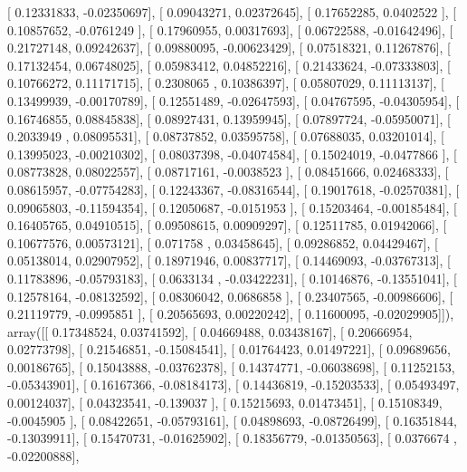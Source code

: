 \documentclass{article}
\begin{document}
       [ 0.12331833, -0.02350697],
       [ 0.09043271,  0.02372645],
       [ 0.17652285,  0.0402522 ],
       [ 0.10857652, -0.0761249 ],
       [ 0.17960955,  0.00317693],
       [ 0.06722588, -0.01642496],
       [ 0.21727148,  0.09242637],
       [ 0.09880095, -0.00623429],
       [ 0.07518321,  0.11267876],
       [ 0.17132454,  0.06748025],
       [ 0.05983412,  0.04852216],
       [ 0.21433624, -0.07333803],
       [ 0.10766272,  0.11171715],
       [ 0.2308065 ,  0.10386397],
       [ 0.05807029,  0.11113137],
       [ 0.13499939, -0.00170789],
       [ 0.12551489, -0.02647593],
       [ 0.04767595, -0.04305954],
       [ 0.16746855,  0.08845838],
       [ 0.08927431,  0.13959945],
       [ 0.07897724, -0.05950071],
       [ 0.2033949 ,  0.08095531],
       [ 0.08737852,  0.03595758],
       [ 0.07688035,  0.03201014],
       [ 0.13995023, -0.00210302],
       [ 0.08037398, -0.04074584],
       [ 0.15024019, -0.0477866 ],
       [ 0.08773828,  0.08022557],
       [ 0.08717161, -0.0038523 ],
       [ 0.08451666,  0.02468333],
       [ 0.08615957, -0.07754283],
       [ 0.12243367, -0.08316544],
       [ 0.19017618, -0.02570381],
       [ 0.09065803, -0.11594354],
       [ 0.12050687, -0.0151953 ],
       [ 0.15203464, -0.00185484],
       [ 0.16405765,  0.04910515],
       [ 0.09508615,  0.00909297],
       [ 0.12511785,  0.01942066],
       [ 0.10677576,  0.00573121],
       [ 0.071758  ,  0.03458645],
       [ 0.09286852,  0.04429467],
       [ 0.05138014,  0.02907952],
       [ 0.18971946,  0.00837717],
       [ 0.14469093, -0.03767313],
       [ 0.11783896, -0.05793183],
       [ 0.0633134 , -0.03422231],
       [ 0.10146876, -0.13551041],
       [ 0.12578164, -0.08132592],
       [ 0.08306042,  0.0686858 ],
       [ 0.23407565, -0.00986606],
       [ 0.21119779, -0.0995851 ],
       [ 0.20565693,  0.00220242],
       [ 0.11600095, -0.02029905]]), array([[ 0.17348524,  0.03741592],
       [ 0.04669488,  0.03438167],
       [ 0.20666954,  0.02773798],
       [ 0.21546851, -0.15084541],
       [ 0.01764423,  0.01497221],
       [ 0.09689656,  0.00186765],
       [ 0.15043888, -0.03762378],
       [ 0.14374771, -0.06038698],
       [ 0.11252153, -0.05343901],
       [ 0.16167366, -0.08184173],
       [ 0.14436819, -0.15203533],
       [ 0.05493497,  0.00124037],
       [ 0.04323541, -0.139037  ],
       [ 0.15215693,  0.01473451],
       [ 0.15108349, -0.0045905 ],
       [ 0.08422651, -0.05793161],
       [ 0.04898693, -0.08726499],
       [ 0.16351844, -0.13039911],
       [ 0.15470731, -0.01625902],
       [ 0.18356779, -0.01350563],
       [ 0.0376674 , -0.02200888],
\end{document}
